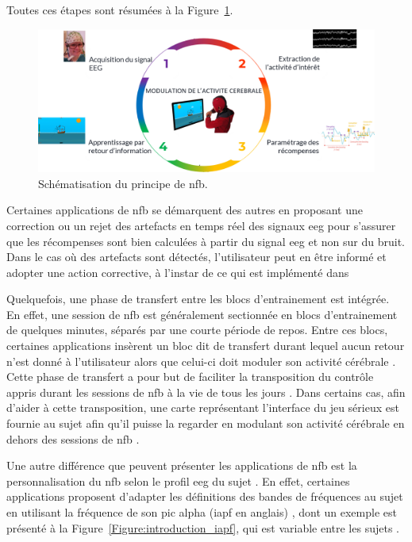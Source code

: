 Toutes ces étapes sont résumées à la Figure~\ref{Figure:introduction_nfb_explications}.

\begin{figure}[h!]
  \centering
	\includegraphics[width=1\linewidth]{figures/chapter-1/introduction-nfb-explication} 
  \caption{Schématisation du principe de \gls{nfb}.}
  \label{Figure:introduction_nfb_explications}
\end{figure}

Certaines applications de \gls{nfb} se démarquent des autres en proposant une correction ou un rejet des artefacts en temps réel des signaux \gls{eeg}
\citep{Maurizio2014, Barthelemy2019, Barthelemy2017} pour s'assurer que les récompenses sont bien calculées à partir du signal \gls{eeg} et non sur du bruit. 
Dans le cas où des artefacts sont détectés, l'utilisateur peut en être informé et adopter une action corrective, à l'instar de ce qui est implémenté dans 
\citep{Bioulac2019}

Quelquefois, une phase de transfert entre les blocs d'entrainement est intégrée. En effet, une session de \gls{nfb} est 
généralement sectionnée en blocs d'entrainement de quelques minutes, séparés par une courte période de repos. Entre ces blocs, certaines applications insèrent 
un bloc dit de transfert durant lequel aucun retour n'est donné à l'utilisateur alors que celui-ci doit moduler son activité cérébrale \citep{Bioulac2019,
Bluschke2016}. Cette phase de transfert a pour but de faciliter la transposition du contrôle appris durant les 
sessions de \gls{nfb} à la vie de tous les jours \citep{Arns2014}. Dans certains cas, afin d'aider à cette transposition, une carte représentant l'interface du jeu sérieux est 
fournie au sujet afin qu'il puisse la regarder en modulant son activité cérébrale en dehors des sessions de \gls{nfb} \citep{Leins2007}. 

Une autre différence que peuvent présenter les applications de \gls{nfb} est la personnalisation du \gls{nfb} selon le profil \gls{eeg} du sujet
\citep{Alkoby2017}. En effet, certaines applications proposent d'adapter les définitions des bandes de fréquences au sujet en utilisant la fréquence de son
pic alpha (\gls{iapf} en anglais) \citep{Alkoby2017, Escolano2014, Bazanova2018}, dont un exemple est présenté à la Figure~\ref{Figure:introduction_iapf}, 
qui est variable entre les sujets \citep{Haegens2014, Aurlien2004, Smit2006}. 

